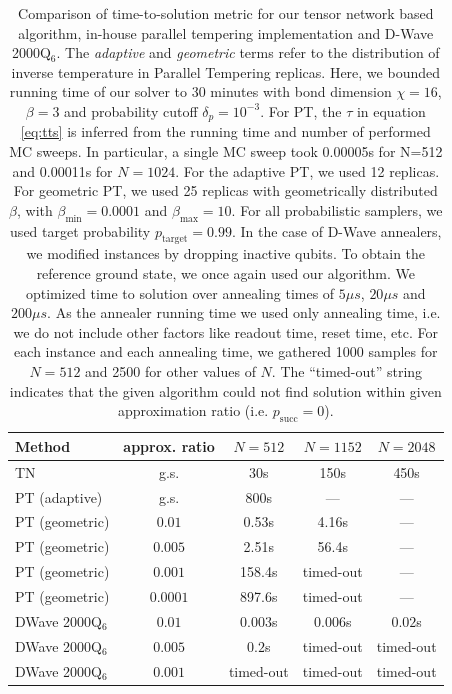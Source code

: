\begin{table}[b]
  \centering
  \begin{tabular}{|l|c|ccc|}
    \hline
    \rowcolor{theader}  Method & approx. ratio & $N=512$   & $N=1152$  & $N=2048$  \\
    \hline
    TN                         & g.s.          & 30s       & 150s      & 450s      \\
    \hline
    \hline
    PT (adaptive)              & g.s.          & 800s      & ---       & ---       \\
    \hline
    PT (geometric)             & $0.01$        & 0.53s     & 4.16s     & ---       \\
    PT (geometric)             & $0.005$       & 2.51s     & 56.4s     & ---       \\
    PT (geometric)             & $0.001$       & 158.4s    & timed-out & ---       \\
    PT (geometric)             & $0.0001$      & 897.6s    & timed-out & ---       \\
    \hline
    \hline
    DWave 2000Q$_6$            & $0.01$        & $0.003$s  & $0.006$s  & $0.02$s   \\
    DWave 2000Q$_6$            & $0.005$       & $0.2$s    & timed-out & timed-out \\
    DWave 2000Q$_6$            & $0.001$       & timed-out & timed-out & timed-out \\
    \hline
    \hline
  \end{tabular}
  \caption{Comparison of time-to-solution metric for our tensor network based algorithm,
    in-house parallel tempering implementation and D-Wave 2000Q$_{6}$. The
    \emph{adaptive} and \emph{geometric} terms refer to the distribution of inverse
    temperature in Parallel Tempering replicas. Here, we bounded running time of
    our solver to 30 minutes with bond dimension $\chi = 16$, $\beta=3$ and
    probability cutoff $\delta_{p} = 10^{-3}$. For PT, the $\tau$ in equation
    \ref{eq:tts} is inferred from the running time and number of performed MC
    sweeps. In particular, a single MC sweep took 0.00005s for N=512 and 0.00011s
    for $N=1024$. For the adaptive PT, we used 12 replicas. For geometric PT, we
    used 25 replicas with geometrically distributed $\beta$, with
    $\beta_{\min}=0.0001$ and $\beta_{\max}=10$. For all probabilistic samplers, we
        used target probability $p_{\mbox{target}}=0.99$. In the case of D-Wave
        annealers, we modified instances by dropping inactive qubits. To obtain the
        reference ground state, we once again used our algorithm. We optimized time to
        solution over annealing times of $5\mu s$, $20\mu s$ and $200\mu s$. As the
        annealer running time we used only annealing time, i.e. we do not include other
        factors like readout time, reset time, etc. For each instance and each
        annealing time, we gathered 1000 samples for $N=512$ and 2500 for other values
        of $N$. The ``timed-out'' string indicates that the given algorithm could not
        find solution within given approximation ratio (i.e. $p_{\mbox{succ}}=0$). }
  \label{tab:tnvspt}
\end{table}


